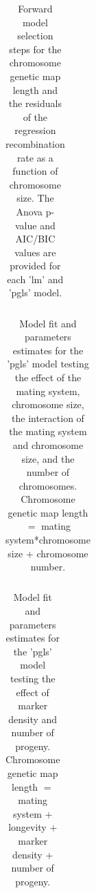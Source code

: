 \documentclass{article}
\begin{document}
\begin{table}[h!]
\centering{}
\caption{Forward model selection steps for the chromosome genetic map length and the residuals of the regression recombination rate as a function of chromosome size. The Anova p-value and AIC/BIC values are provided for each 'lm' and 'pgls' model.}
\begin{tabular}{cccccccc}
\end{tabular}
\label{table:tableS2}
\end{table}



\begin{table}[h!]
\centering{}
\caption{Model fit and parameters estimates for the 'pgls' model testing the effect of the mating system, chromosome size, the interaction of the mating system and chromosome size, and the number of chromosomes. Chromosome genetic map length $=$ mating system*chromosome size + chromosome number.}
\begin{tabular}{cccccccc}
\end{tabular}
\label{table:tableS3}
\end{table}


\begin{table}[h!]
\centering{}
\caption{Model fit and parameters estimates for the 'pgls' model testing the effect of marker density and number of progeny. Chromosome genetic map length $=$ mating system + longevity + marker density + number of progeny.}
\begin{tabular}{cccccccc}
\end{tabular}
\label{table:tableS4}
\end{table}
\end{document}

